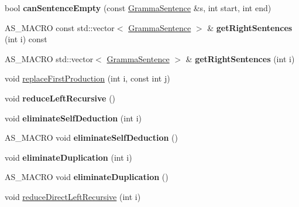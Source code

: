 \begin{DoxyCompactItemize}
\mbox{\label{classx2_1_1_gramma_a11f1d43bcba6ed42c3bc6771745eb9c5}} 
bool {\bfseries can\+Sentence\+Empty} (const \hyperlink{classx2_1_1_gramma_sentence}{Gramma\+Sentence} \&s, int start, int end)
\item 
\mbox{\label{classx2_1_1_gramma_ae3eaf6c1a28873ca324ec3cc33f3e47c}} 
A\+S\+\_\+\+M\+A\+C\+RO const std\+::vector$<$ \hyperlink{classx2_1_1_gramma_sentence}{Gramma\+Sentence} $>$ \& {\bfseries get\+Right\+Sentences} (int i) const
\item 
\mbox{\label{classx2_1_1_gramma_a1d34706fe75ade7df4e0e45800d9a652}} 
A\+S\+\_\+\+M\+A\+C\+RO std\+::vector$<$ \hyperlink{classx2_1_1_gramma_sentence}{Gramma\+Sentence} $>$ \& {\bfseries get\+Right\+Sentences} (int i)
\item 
void \hyperlink{classx2_1_1_gramma_aa5e24a49dbf499af546703b594ef4a51}{replace\+First\+Production} (int i, const int j)
\item 
\mbox{\label{classx2_1_1_gramma_a621ddb8f04f2c00e747940bde3bbf6e6}} 
void {\bfseries reduce\+Left\+Recursive} ()
\item 
\mbox{\label{classx2_1_1_gramma_ab87bf7edf41374f02def88a3ebcb4407}} 
void {\bfseries eliminate\+Self\+Deduction} (int i)
\item 
\mbox{\label{classx2_1_1_gramma_a1a94a73d06f42e99630d434f79593bdc}} 
A\+S\+\_\+\+M\+A\+C\+RO void {\bfseries eliminate\+Self\+Deduction} ()
\item 
\mbox{\label{classx2_1_1_gramma_a5fb5250196eadcb35ab2f3c33ffaee4a}} 
void {\bfseries eliminate\+Duplication} (int i)
\item 
\mbox{\label{classx2_1_1_gramma_ac9f8249e01fe17a2b2fd6cc1e4e7155a}} 
A\+S\+\_\+\+M\+A\+C\+RO void {\bfseries eliminate\+Duplication} ()
\item 
void \hyperlink{classx2_1_1_gramma_abc0b45a3d37e2955bc89d74bb5234697}{reduce\+Direct\+Left\+Recursive} (int i)
\item 
\mbox{\label{classx2_1_1_gramma_ab0c313d702258f7d93aad0faf2095eb0}} 

\end{DoxyCompactItemize}
